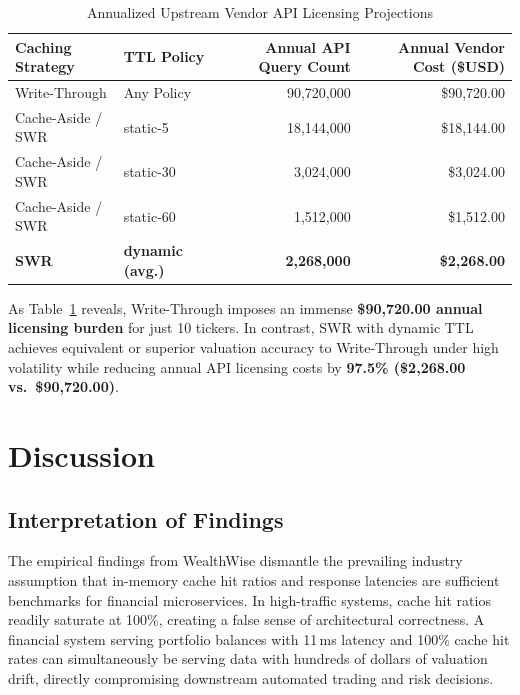 \documentclass[11pt,a4paper]{article}
\begin{document}
\begin{table}[htbp]
\centering
\caption{Annualized Upstream Vendor API Licensing Projections}
\label{tab:annual_cost}
\small
\begin{tabular}{llrr}
\toprule
\textbf{Caching Strategy} & \textbf{TTL Policy} & \textbf{Annual API Query Count} & \textbf{Annual Vendor Cost (\$USD)} \\
\midrule
Write-Through & Any Policy & 90{,}720{,}000 & \$90{,}720.00 \\
Cache-Aside / SWR & static-5  & 18{,}144{,}000 & \$18{,}144.00 \\
Cache-Aside / SWR & static-30 & 3{,}024{,}000  & \$3{,}024.00 \\
Cache-Aside / SWR & static-60 & 1{,}512{,}000  & \$1{,}512.00 \\
\textbf{SWR} & \textbf{dynamic (avg.)} & \textbf{2{,}268{,}000} & \textbf{\$2{,}268.00} \\
\bottomrule
\end{tabular}
\end{table}

As Table~\ref{tab:annual_cost} reveals, Write-Through imposes an immense \textbf{\$90{,}720.00 annual licensing burden} for just 10 tickers. In contrast, SWR with dynamic TTL achieves equivalent or superior valuation accuracy to Write-Through under high volatility while reducing annual API licensing costs by \textbf{97.5\% (\$2{,}268.00 vs.\ \$90{,}720.00)}.

\section{Discussion}
\label{sec:discussion}

\subsection{Interpretation of Findings}

The empirical findings from WealthWise dismantle the prevailing industry assumption that in-memory cache hit ratios and response latencies are sufficient benchmarks for financial microservices. In high-traffic systems, cache hit ratios readily saturate at 100\%, creating a false sense of architectural correctness. A financial system serving portfolio balances with 11\,ms latency and 100\% cache hit rates can simultaneously be serving data with hundreds of dollars of valuation drift, directly compromising downstream automated trading and risk decisions.
\end{document}
